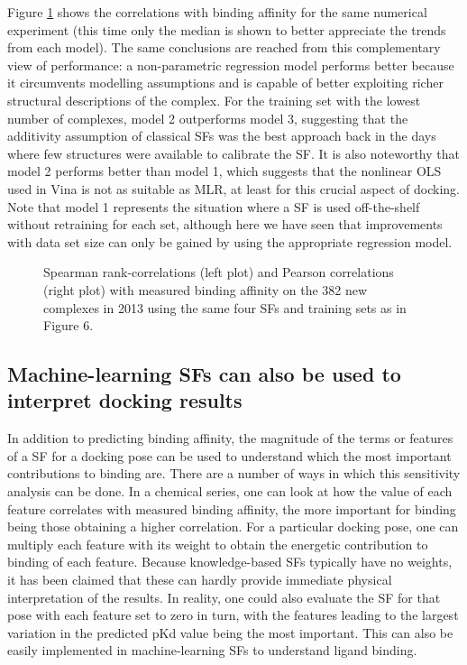 Figure \ref{rfscore3:partitions2345RsRp} shows the correlations with binding affinity for the same numerical experiment (this time only the median is shown to better appreciate the trends from each model). The same conclusions are reached from this complementary view of performance: a non-parametric regression model performs better because it circumvents modelling assumptions and is capable of better exploiting richer structural descriptions of the complex. For the training set with the lowest number of complexes, model 2 outperforms model 3, suggesting that the additivity assumption of classical SFs was the best approach back in the days where few structures were available to calibrate the SF. It is also noteworthy that model 2 performs better than model 1, which suggests that the nonlinear OLS used in Vina is not as suitable as MLR, at least for this crucial aspect of docking. Note that model 1 represents the situation where a SF is used off-the-shelf without retraining for each set, although here we have seen that improvements with data set size can only be gained by using the appropriate regression model.

\begin{figure}
\centering
{}
\caption{Spearman rank-correlations (left plot) and Pearson correlations (right plot) with measured binding affinity on the 382 new complexes in 2013 using the same four SFs and training sets as in Figure 6.}
\label{rfscore3:partitions2345RsRp}
\end{figure}

\subsection{Machine-learning SFs can also be used to interpret docking results}

In addition to predicting binding affinity, the magnitude of the terms or features of a SF for a docking pose can be used to understand which the most important contributions to binding are. There are a number of ways in which this sensitivity analysis can be done. In a chemical series, one can look at how the value of each feature correlates with measured binding affinity, the more important for binding being those obtaining a higher correlation. For a particular docking pose, one can multiply each feature with its weight to obtain the energetic contribution to binding of each feature. Because knowledge-based SFs typically have no weights, it has been claimed \citep{1372} that these can hardly provide immediate physical interpretation of the results. In reality, one could also evaluate the SF for that pose with each feature set to zero in turn, with the features leading to the largest variation in the predicted pKd value being the most important. This can also be easily implemented in machine-learning SFs to understand ligand binding.

